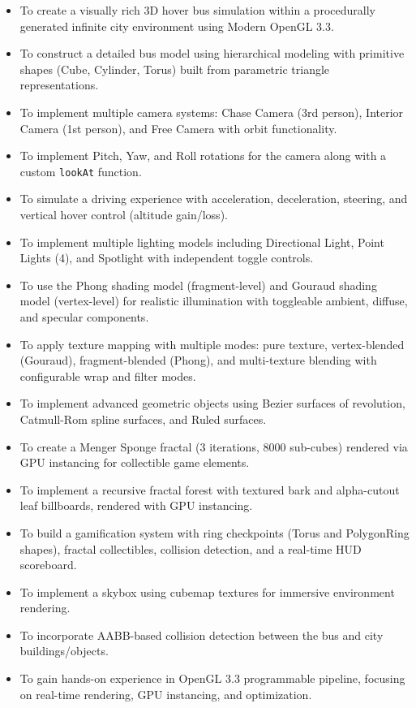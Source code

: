 \documentclass[12pt,a4paper]{article}
\begin{document}
\begin{itemize}
    \item To create a visually rich 3D hover bus simulation within a procedurally generated infinite city environment using Modern OpenGL 3.3.
    \item To construct a detailed bus model using hierarchical modeling with primitive shapes (Cube, Cylinder, Torus) built from parametric triangle representations.
    \item To implement multiple camera systems: Chase Camera (3rd person), Interior Camera (1st person), and Free Camera with orbit functionality.
    \item To implement Pitch, Yaw, and Roll rotations for the camera along with a custom \texttt{lookAt} function.
    \item To simulate a driving experience with acceleration, deceleration, steering, and vertical hover control (altitude gain/loss).
    \item To implement multiple lighting models including Directional Light, Point Lights (4), and Spotlight with independent toggle controls.
    \item To use the Phong shading model (fragment-level) and Gouraud shading model (vertex-level) for realistic illumination with toggleable ambient, diffuse, and specular components.
    \item To apply texture mapping with multiple modes: pure texture, vertex-blended (Gouraud), fragment-blended (Phong), and multi-texture blending with configurable wrap and filter modes.
    \item To implement advanced geometric objects using Bezier surfaces of revolution, Catmull-Rom spline surfaces, and Ruled surfaces.
    \item To create a Menger Sponge fractal (3 iterations, 8000 sub-cubes) rendered via GPU instancing for collectible game elements.
    \item To implement a recursive fractal forest with textured bark and alpha-cutout leaf billboards, rendered with GPU instancing.
    \item To build a gamification system with ring checkpoints (Torus and PolygonRing shapes), fractal collectibles, collision detection, and a real-time HUD scoreboard.
    \item To implement a skybox using cubemap textures for immersive environment rendering.
    \item To incorporate AABB-based collision detection between the bus and city buildings/objects.
    \item To gain hands-on experience in OpenGL 3.3 programmable pipeline, focusing on real-time rendering, GPU instancing, and optimization.
\end{itemize}
\end{document}

